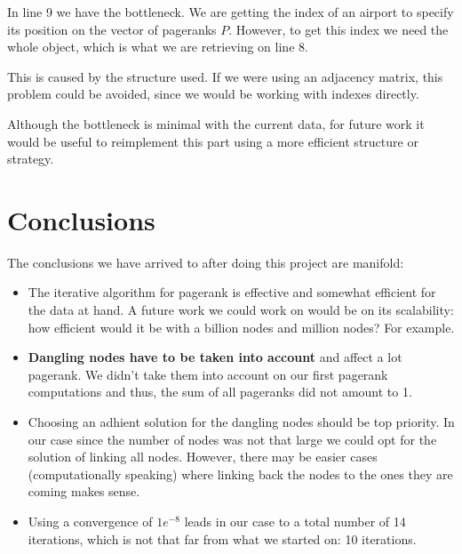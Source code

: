 \documentclass[10pt, a4paper]{article}
\begin{document}
In line 9 we have the bottleneck. We are getting the index of an airport to specify its position on the vector of pageranks $P$. However, to get this index we need the whole object, which is what we are retrieving on line 8.

This is caused by the structure used. If we were using an adjacency matrix, this problem could be avoided, since we would be working with indexes directly.

Although the bottleneck is minimal with the current data, for future work it would be useful to reimplement this part using a more efficient structure or strategy.

\section{Conclusions}
The conclusions we have arrived to after doing this project are manifold:
\begin{itemize}
    \item The iterative algorithm for pagerank is effective and somewhat efficient for the data at hand. A future work we could work on would be on its scalability: how efficient would it be with a billion nodes and million nodes? For example.
    \item \textbf{Dangling nodes have to be taken into account} and affect a lot pagerank. We didn't take them into account on our first pagerank computations and thus, the sum of all pageranks did not amount to 1. 
    \item Choosing an adhient solution for the dangling nodes should be top priority. In our case since the number of nodes was not that large we could opt for the solution of linking all nodes. However, there may be easier cases (computationally speaking) where linking back the nodes to the ones they are coming makes sense.
    \item Using a convergence of $1e^{-8}$ leads in our case to a total number of 14 iterations, which is not that far from what we started on: 10 iterations.
\end{itemize}

\nocite{*}


\end{document}
